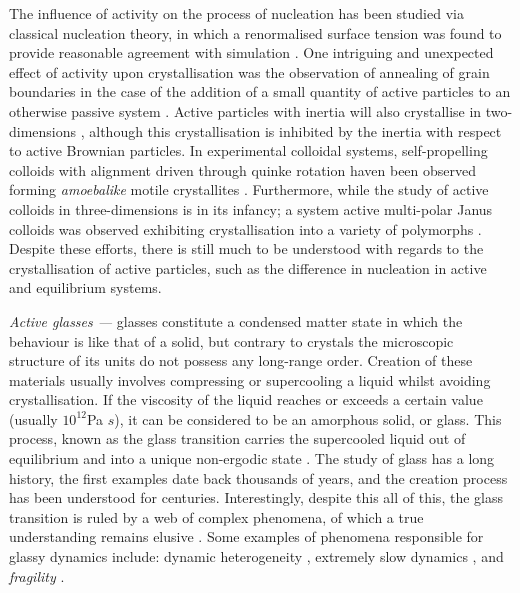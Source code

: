The influence of activity on the process of nucleation has been studied via classical nucleation theory, in which a renormalised surface tension was found to provide reasonable agreement with simulation \cite{redner2016}. One intriguing and unexpected effect of activity upon crystallisation was the observation of annealing of grain boundaries in the case of the addition of a small quantity of active particles to an otherwise passive system \cite{vandermeer2016}. Active particles with inertia will also crystallise in two-dimensions \cite{liao2021}, although this crystallisation is inhibited by the inertia with respect to active Brownian particles.
In experimental colloidal systems, self-propelling colloids with alignment driven through quinke rotation haven been observed forming \textit{amoebalike} motile crystallites \cite{mauleonamieva2020}. Furthermore, while the study of active colloids in three-dimensions is in its infancy; a system active multi-polar Janus colloids was observed exhibiting crystallisation into a variety of polymorphs \cite{sakai2020} .
Despite these efforts, there is still much to be understood with regards to the crystallisation of active particles, such as the difference in nucleation in active and equilibrium systems.


\textit{Active glasses ---} glasses constitute a condensed matter state in which the behaviour is like that of a solid, but contrary to crystals the microscopic structure of its units do not possess any long-range order. Creation of these materials usually involves compressing or supercooling a liquid whilst avoiding crystallisation. If the viscosity of the liquid reaches or exceeds a certain value (usually $10^{12}$Pa $s$), it can be considered to be an amorphous solid, or glass. This process, known as the glass transition carries the supercooled liquid out of equilibrium and into a unique non-ergodic state \cite{janssen2019}.
The study of glass has a long history, the first examples date back thousands of years, and the creation process has been understood for centuries. Interestingly, despite this all of this, the glass transition is ruled by a web of complex phenomena, of which a true understanding remains elusive \cite{berthier2011}. Some examples of phenomena responsible for glassy dynamics include: dynamic heterogeneity \cite{kawasaki2007}, extremely slow dynamics \cite{malins2013}, and \textit{fragility} \cite{sastry2001}.  



